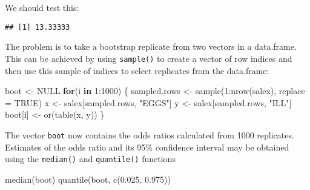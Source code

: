 \documentclass[
  12pt,
  a4paper]{book}
\newenvironment{Shaded}{\begin{snugshade}}{\end{snugshade}}
\newcommand{\AttributeTok}[1]{\textcolor[rgb]{0.77,0.63,0.00}{#1}}
\newcommand{\ConstantTok}[1]{\textcolor[rgb]{0.00,0.00,0.00}{#1}}
\newcommand{\ControlFlowTok}[1]{\textcolor[rgb]{0.13,0.29,0.53}{\textbf{#1}}}
\newcommand{\DecValTok}[1]{\textcolor[rgb]{0.00,0.00,0.81}{#1}}
\newcommand{\FloatTok}[1]{\textcolor[rgb]{0.00,0.00,0.81}{#1}}
\newcommand{\FunctionTok}[1]{\textcolor[rgb]{0.00,0.00,0.00}{#1}}
\newcommand{\NormalTok}[1]{#1}
\newcommand{\OtherTok}[1]{\textcolor[rgb]{0.56,0.35,0.01}{#1}}
\newcommand{\SpecialCharTok}[1]{\textcolor[rgb]{0.00,0.00,0.00}{#1}}
\newcommand{\StringTok}[1]{\textcolor[rgb]{0.31,0.60,0.02}{#1}}
\begin{document}
We should test this:

\begin{Shaded}
\end{Shaded}

\begin{verbatim}
## [1] 13.33333
\end{verbatim}

The problem is to take a bootstrap replicate from two vectors in a data.frame. This can be achieved by using \texttt{sample()} to create a vector of row indices and then use this sample of indices to select replicates from the data.frame:

\begin{Shaded}
\begin{Highlighting}[]
\NormalTok{boot }\OtherTok{\textless{}{-}} \ConstantTok{NULL}
\ControlFlowTok{for}\NormalTok{(i }\ControlFlowTok{in} \DecValTok{1}\SpecialCharTok{:}\DecValTok{1000}\NormalTok{) \{}
\NormalTok{  sampled.rows }\OtherTok{\textless{}{-}} \FunctionTok{sample}\NormalTok{(}\DecValTok{1}\SpecialCharTok{:}\FunctionTok{nrow}\NormalTok{(salex), }\AttributeTok{replace =} \ConstantTok{TRUE}\NormalTok{)}
\NormalTok{  x }\OtherTok{\textless{}{-}}\NormalTok{ salex[sampled.rows, }\StringTok{"EGGS"}\NormalTok{]}
\NormalTok{  y }\OtherTok{\textless{}{-}}\NormalTok{ salex[sampled.rows, }\StringTok{"ILL"}\NormalTok{]}
\NormalTok{  boot[i] }\OtherTok{\textless{}{-}} \FunctionTok{or}\NormalTok{(}\FunctionTok{table}\NormalTok{(x, y))}
\NormalTok{\}}
\end{Highlighting}
\end{Shaded}

The vector \texttt{boot} now contains the odds ratios calculated from 1000 replicates. Estimates of the odds ratio and its 95\% confidence interval may be obtained using the \texttt{median()} and \texttt{quantile()} functions

\begin{Shaded}
\begin{Highlighting}[]
\FunctionTok{median}\NormalTok{(boot)}
\FunctionTok{quantile}\NormalTok{(boot, }\FunctionTok{c}\NormalTok{(}\FloatTok{0.025}\NormalTok{, }\FloatTok{0.975}\NormalTok{))}
\end{Highlighting}
\end{Shaded}
\end{document}
